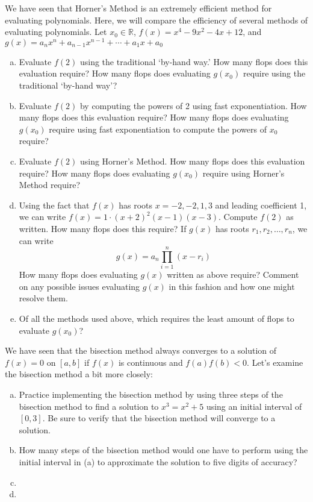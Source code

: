 \documentclass[11pt,letterpaper]{article}
\begin{document}


 We have seen that Horner's Method is an extremely efficient method for evaluating polynomials. Here, we will compare the efficiency of several methods of evaluating polynomials. Let $x_0 \in \mathbb{R}$, $f(x)= x^4 - 9x^2 - 4x + 12$, and $g(x)= a_nx^n + a_{n-1}x^{n-1} + \cdots + a_1x + a_0$
	\begin{enumerate}[(a)]
	\item Evaluate $f(2)$ using the traditional `by-hand way.' How many flops does this evaluation require? How many flops does evaluating $g(x_0)$ require using the traditional `by-hand way'?
	\item Evaluate $f(2)$ by computing the powers of 2 using fast exponentiation. How many flops does this evaluation require? How many flops does evaluating $g(x_0)$ require using fast exponentiation to compute the powers of $x_0$ require?
	\item Evaluate $f(2)$ using Horner's Method. How many flops does this evaluation require? How many flops does evaluating $g(x_0)$ require using Horner's Method require?
	\item Using the fact that $f(x)$ has roots $x= -2, -2, 1, 3$ and leading coefficient 1, we can write $f(x)= 1 \cdot (x + 2)^2 (x - 1)(x - 3)$. Compute $f(2)$ as written. How many flops does this require? If $g(x)$ has roots $r_1, r_2, \ldots, r_n$, we can write
		\[
		g(x)= a_n \prod_{i=1}^n (x - r_i)
		\]
	How many flops does evaluating $g(x)$ written as above require? Comment on any possible issues evaluating $g(x)$ in this fashion and how one might resolve them. 
	\item Of all the methods used above, which requires the least amount of flops to evaluate $g(x_0)$?
	\end{enumerate}



\newpage



 We have seen that the bisection method always converges to a solution of $f(x)= 0$ on $[a, b]$ if $f(x)$ is continuous and $f(a)f(b) < 0$. Let's examine the bisection method a bit more closely:
	\begin{enumerate}[(a)]
	\item Practice implementing the bisection method by using three steps of the bisection method to find a solution to $x^3= x^2 + 5$ using an initial interval of $[0, 3]$. Be sure to verify that the bisection method will converge to a solution.
	\item How many steps of the bisection method would one have to perform using the initial interval in (a) to approximate the solution to five digits of accuracy?
	\item 
	\item 
	\end{enumerate}
\end{document}
